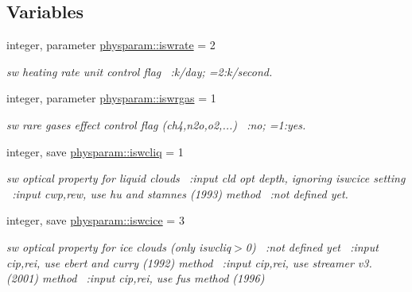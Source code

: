 \subsection*{Variables}
\begin{DoxyCompactItemize}
\item 
integer, parameter \hyperlink{namespacephysparam_a20514cb92f09ee6e32f2f1def570ace1}{physparam\+::iswrate} = 2
\begin{DoxyCompactList}\small\item\em sw heating rate unit control flag ~\+:k/day; =2\+:k/second. \end{DoxyCompactList}\item 
integer, parameter \hyperlink{namespacephysparam_a8782cc8df3a1d906c2ddb3d900468568}{physparam\+::iswrgas} = 1
\begin{DoxyCompactList}\small\item\em sw rare gases effect control flag (ch4,n2o,o2,...) ~\+:no; =1\+:yes. \end{DoxyCompactList}\item 
integer, save \hyperlink{namespacephysparam_a7ad8c8c5860089a86ef637429c7d4d27}{physparam\+::iswcliq} = 1
\begin{DoxyCompactList}\small\item\em sw optical property for liquid clouds ~\+:input cld opt depth, ignoring iswcice setting ~\+:input cwp,rew, use hu and stamnes (1993) method ~\+:not defined yet. \end{DoxyCompactList}\item 
integer, save \hyperlink{namespacephysparam_a7b5967eca1b21aa0d5ccd9531a6f8abb}{physparam\+::iswcice} = 3
\begin{DoxyCompactList}\small\item\em sw optical property for ice clouds (only iswcliq$>$0) ~\+:not defined yet ~\+:input cip,rei, use ebert and curry (1992) method ~\+:input cip,rei, use streamer v3. (2001) method ~\+:input cip,rei, use fu\textquotesingle{}s method (1996) \end{DoxyCompactList}\item 

\end{DoxyCompactItemize}
